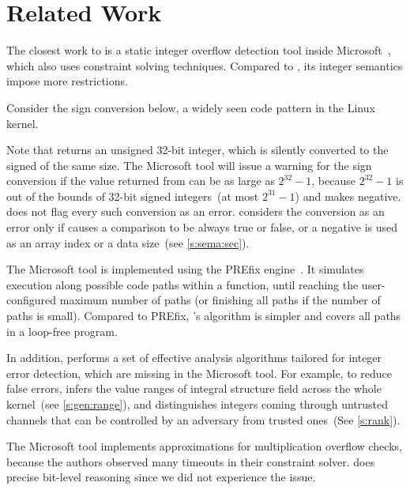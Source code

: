 \section{Related Work}
\label{s:relwk}

The closest work to \sys is a static integer overflow detection
tool inside Microsoft~\cite{moy:z3prefix}, which also uses
constraint solving techniques.
Compared to \sys, its integer semantics impose more restrictions.

Consider the sign conversion below, a widely seen code pattern in
the Linux kernel.

Note that  returns an unsigned 32-bit integer, which
is silently converted to the signed  of the same size.
The Microsoft tool will issue a warning for the sign conversion if
the value returned from  can be as large as $2^{32}
- 1$, because $2^{32} - 1$ is out of the bounds of 32-bit signed
integers~(at most $2^{31} - 1$) and makes  negative.
%
\sys does not flag every such conversion as an error.  \sys considers
the conversion as an error only if  causes a comparison
to be always true or false, or a negative  is used as
an array index or a data size~(see \autoref{s:sema:sec}).

The Microsoft tool is implemented using the PREfix
engine~\cite{bush:prefix}.  It simulates execution along possible
code paths within a function, until reaching
the user-configured maximum number of paths (or finishing all paths
if the number of paths is small).
%
Compared to PREfix, \sys's algorithm is simpler
and covers all paths in a loop-free program.
\fi

In addition, \sys performs a set of effective analysis algorithms
tailored for integer error detection, which are missing in the
Microsoft tool.  For example, to reduce false errors, \sys infers
the value ranges of integral structure field across the whole
kernel~(see \autoref{s:gen:range}), and distinguishes integers coming
through untrusted channels that can be controlled by an adversary
from trusted ones~(See \autoref{s:rank}).

The Microsoft tool implements approximations for multiplication
overflow checks, because the authors observed many timeouts in their
constraint solver.  \sys does precise bit-level reasoning
since we did not experience the issue.
\fi


